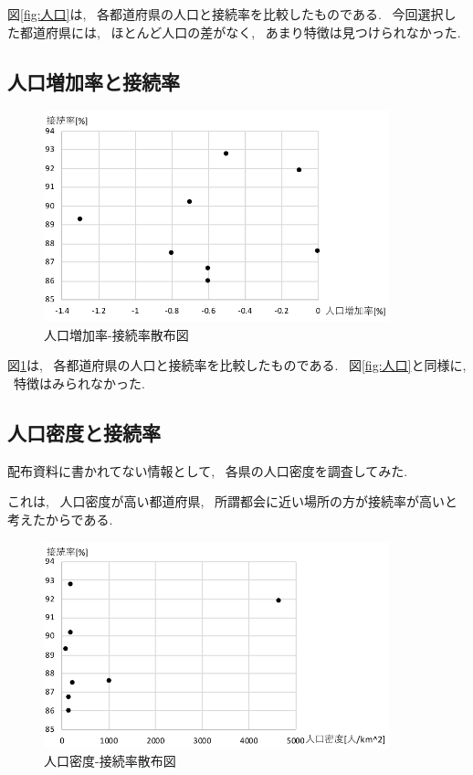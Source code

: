 \documentclass{jsarticle}
\begin{document}
        図\ref{fig:人口}は, ~各都道府県の人口と接続率を比較したものである.
        ~今回選択した都道府県には, ~ほとんど人口の差がなく,
        ~あまり特徴は見つけられなかった.

    \subsection{人口増加率と接続率}
        \begin{figure}[ht]
            \begin{center}
                \includegraphics[width=10cm]{jinkouzouka.pdf}
                \caption{人口増加率-接続率散布図}
                \label{fig:人口増加}
            \end{center}
        \end{figure}

        図\ref{fig:人口増加}は, ~各都道府県の人口と接続率を比較したものである.
        ~図\ref{fig:人口}と同様に, ~特徴はみられなかった.

    \subsection{人口密度と接続率}
        配布資料に書かれてない情報として,
        ~各県の人口密度を調査してみた.

        これは, ~人口密度が高い都道府県,
        ~所謂都会に近い場所の方が接続率が高いと考えたからである.

        \begin{figure}[ht]
            \begin{center}
                \includegraphics[width=10cm]{mitudo.pdf}
                \caption{人口密度-接続率散布図}
                \label{fig:人口密度}
            \end{center}
        \end{figure}
\end{document}
